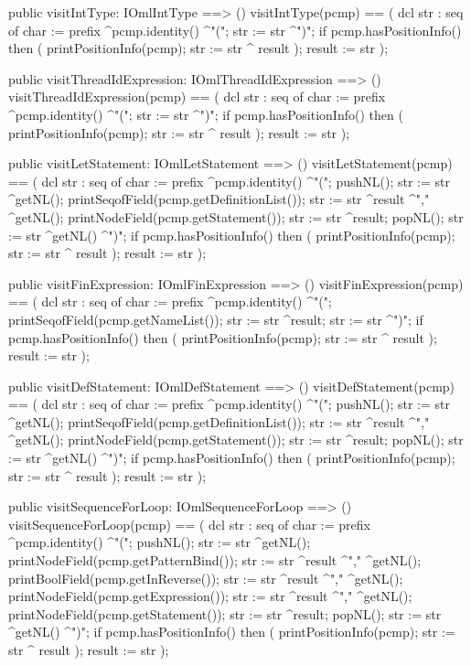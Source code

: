 \begin{vdm_al}
  public visitIntType: IOmlIntType ==> ()
  visitIntType(pcmp) ==
    ( dcl str : seq of char := prefix ^pcmp.identity() ^"(";
      str := str ^")";
      if pcmp.hasPositionInfo()
      then ( printPositionInfo(pcmp);
             str := str ^ result );
      result := str );

  public visitThreadIdExpression: IOmlThreadIdExpression ==> ()
  visitThreadIdExpression(pcmp) ==
    ( dcl str : seq of char := prefix ^pcmp.identity() ^"(";
      str := str ^")";
      if pcmp.hasPositionInfo()
      then ( printPositionInfo(pcmp);
             str := str ^ result );
      result := str );

  public visitLetStatement: IOmlLetStatement ==> ()
  visitLetStatement(pcmp) ==
    ( dcl str : seq of char := prefix ^pcmp.identity() ^"(";
      pushNL();
      str := str ^getNL();
      printSeqofField(pcmp.getDefinitionList());
      str := str ^result ^"," ^getNL();
      printNodeField(pcmp.getStatement());
      str := str ^result;
      popNL();
      str := str ^getNL() ^")";
      if pcmp.hasPositionInfo()
      then ( printPositionInfo(pcmp);
             str := str ^ result );
      result := str );

  public visitFinExpression: IOmlFinExpression ==> ()
  visitFinExpression(pcmp) ==
    ( dcl str : seq of char := prefix ^pcmp.identity() ^"(";
      printSeqofField(pcmp.getNameList());
      str := str ^result;
      str := str ^")";
      if pcmp.hasPositionInfo()
      then ( printPositionInfo(pcmp);
             str := str ^ result );
      result := str );

  public visitDefStatement: IOmlDefStatement ==> ()
  visitDefStatement(pcmp) ==
    ( dcl str : seq of char := prefix ^pcmp.identity() ^"(";
      pushNL();
      str := str ^getNL();
      printSeqofField(pcmp.getDefinitionList());
      str := str ^result ^"," ^getNL();
      printNodeField(pcmp.getStatement());
      str := str ^result;
      popNL();
      str := str ^getNL() ^")";
      if pcmp.hasPositionInfo()
      then ( printPositionInfo(pcmp);
             str := str ^ result );
      result := str );

  public visitSequenceForLoop: IOmlSequenceForLoop ==> ()
  visitSequenceForLoop(pcmp) ==
    ( dcl str : seq of char := prefix ^pcmp.identity() ^"(";
      pushNL();
      str := str ^getNL();
      printNodeField(pcmp.getPatternBind());
      str := str ^result ^"," ^getNL();
      printBoolField(pcmp.getInReverse());
      str := str ^result ^"," ^getNL();
      printNodeField(pcmp.getExpression());
      str := str ^result ^"," ^getNL();
      printNodeField(pcmp.getStatement());
      str := str ^result;
      popNL();
      str := str ^getNL() ^")";
      if pcmp.hasPositionInfo()
      then ( printPositionInfo(pcmp);
             str := str ^ result );
      result := str );


\end{vdm_al}
